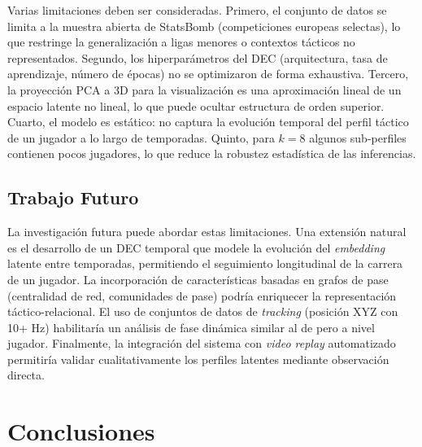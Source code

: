 \documentclass[conference]{IEEEtran}
\begin{document}
Varias limitaciones deben ser consideradas. Primero, el conjunto de datos se limita a la muestra abierta de StatsBomb (competiciones europeas selectas), lo que restringe la generalización a ligas menores o contextos tácticos no representados. Segundo, los hiperparámetros del DEC (arquitectura, tasa de aprendizaje, número de épocas) no se optimizaron de forma exhaustiva. Tercero, la proyección PCA a 3D para la visualización es una aproximación lineal de un espacio latente no lineal, lo que puede ocultar estructura de orden superior. Cuarto, el modelo es estático: no captura la evolución temporal del perfil táctico de un jugador a lo largo de temporadas. Quinto, para $k=8$ algunos sub-perfiles contienen pocos jugadores, lo que reduce la robustez estadística de las inferencias.

\subsection{Trabajo Futuro}

La investigación futura puede abordar estas limitaciones. Una extensión natural es el desarrollo de un DEC temporal que modele la evolución del \textit{embedding} latente entre temporadas, permitiendo el seguimiento longitudinal de la carrera de un jugador. La incorporación de características basadas en grafos de pase (centralidad de red, comunidades de pase) podría enriquecer la representación táctico-relacional. El uso de conjuntos de datos de \textit{tracking} (posición XYZ con 10+ Hz) habilitaría un análisis de fase dinámica similar al de \citeauthor{demir2026how} pero a nivel jugador. Finalmente, la integración del sistema con \textit{video replay} automatizado permitiría validar cualitativamente los perfiles latentes mediante observación directa.

\section{Conclusiones}
\end{document}
